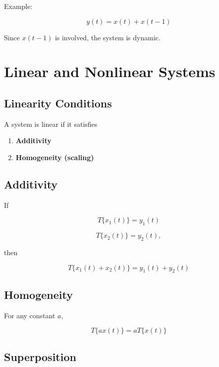 Example:

\[
y(t)=x(t)+x(t-1)
\]

Since \(x(t-1)\) is involved, the system is dynamic.


\section{Linear and Nonlinear Systems}


\subsection{Linearity Conditions}

A system is linear if it satisfies

\begin{enumerate}
\item \textbf{Additivity}
\item \textbf{Homogeneity (scaling)}
\end{enumerate}


\subsection{Additivity}

If

\[
T\{x_1(t)\}=y_1(t)
\]

\[
T\{x_2(t)\}=y_2(t),
\]

then

\[
\boxed{
T\{x_1(t)+x_2(t)\}=y_1(t)+y_2(t)
}
\]


\subsection{Homogeneity}

For any constant \(a\),

\[
\boxed{
T\{ax(t)\}=aT\{x(t)\}
}
\]


\subsection{Superposition}

